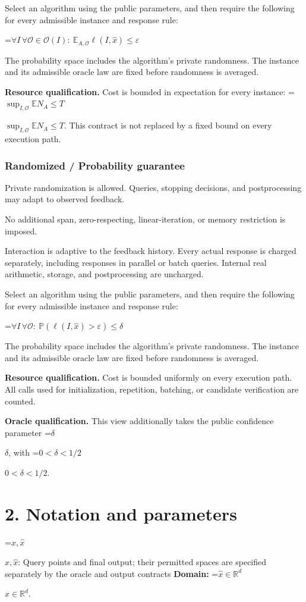 \documentclass[10pt,a4paper]{article}
\newcommand{\AtlasMath}[1]{\par\begingroup\centering\setbox0=\hbox{$\displaystyle #1$}\ifdim\wd0>1.4\linewidth\typeout{ATLAS WIDE FORMULA: \the\wd0}\fi\ifdim\wd0>\linewidth\resizebox{\linewidth}{!}{\box0}\else\box0\fi\par\endgroup}
\newcommand{\AtlasInlineMath}[1]{\begingroup\setbox0=\hbox{$#1$}\ifdim\wd0>.4\linewidth\endgroup\AtlasMath{#1}\else\endgroup$#1$\fi}
\begin{document}
Select an algorithm using the public parameters, and then require the following for every admissible instance and response rule:


\AtlasMath{\forall I\,\forall\mathcal{O}\in\mathcal{O}(I):\ \mathbb{E}_{A,\mathcal{O}}\ell(I,\widehat{x})\le\varepsilon}


The probability space includes the algorithm's private randomness. The instance and its admissible oracle law are fixed before randomness is averaged.

\textbf{Resource qualification.} Cost is bounded in expectation for every instance: \AtlasInlineMath{\sup_{I,\mathcal O}\mathbb E N_A\le T}. This contract is not replaced by a fixed bound on every execution path.

\subsubsection{Randomized / Probability guarantee}
Private randomization is allowed. Queries, stopping decisions, and postprocessing may adapt to observed feedback.

No additional span, zero-respecting, linear-iteration, or memory restriction is imposed.

Interaction is adaptive to the feedback history. Every actual response is charged separately, including responses in parallel or batch queries. Internal real arithmetic, storage, and postprocessing are uncharged.

Select an algorithm using the public parameters, and then require the following for every admissible instance and response rule:


\AtlasMath{\forall I\,\forall\mathcal{O}:\ \mathbb{P}(\ell(I,\widehat{x})>\varepsilon)\le\delta}


The probability space includes the algorithm's private randomness. The instance and its admissible oracle law are fixed before randomness is averaged.

\textbf{Resource qualification.} Cost is bounded uniformly on every execution path. All calls used for initialization, repetition, batching, or candidate verification are counted.

\textbf{Oracle qualification.} This view additionally takes the public confidence parameter \AtlasInlineMath{\delta}, with \AtlasInlineMath{0<\delta<1/2}.

\section{2. Notation and parameters}
\AtlasInlineMath{x,\widehat{x}}: Query points and final output; their permitted spaces are specified separately by the oracle and output contracts \textbf{Domain:} \AtlasInlineMath{\widehat{x}\in \mathbb{R}^d}.
\end{document}
